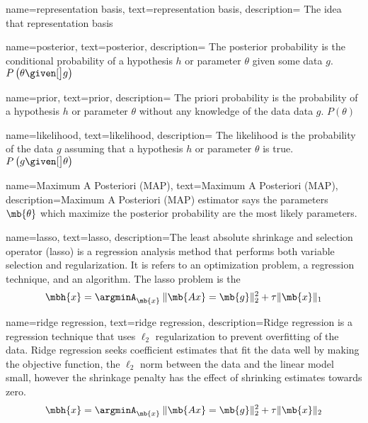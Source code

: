 {
name={representation basis},
text={representation basis},
description={ The idea that representation basis}
}

{
name={posterior},
text={posterior},
description={ The posterior probability is the conditional probability of a hypothesis $h$ or parameter $\theta$ given some data $g$. $ P \left( \theta \given[\big] g \right) $}
}

{
name={prior},
text={prior},
description={ The priori probability is the probability of a hypothesis $h$ or parameter $\theta$ without any knowledge of the data data $g$. $ P \left( \theta \right) $}
}

{
name={likelihood},
text={likelihood},
description={ The likelihood is the probability of the data $g$ assuming that a hypothesis $h$ or parameter $\theta$ is true. $P \left( g \given[\big] \theta \right)$}
}

{
name={Maximum A Posteriori (MAP)},
text={Maximum A Posteriori (MAP)},
description={Maximum A Posteriori (MAP) estimator says the parameters  $ \mb{\theta} $ which maximize the \gls{posterior} probability are the most likely parameters.}
}

{
name={lasso},
text={lasso},
description={The least absolute shrinkage and selection operator (lasso) is a regression analysis method that performs both variable selection and regularization. It is refers to an optimization problem, a regression technique, and an algorithm. The lasso problem is the
%
\begin{equation*}
	\mbh{x} = \argminA_{\mb{x}} \: \| \mb{Ax} = \mb{g} \|_{2}^{2} + \tau \| \mb{x} \|_1
\end{equation*}
 }
}

{
name={ridge regression},
text={ridge regression},
description={Ridge regression is a regression technique that uses $\ell_2$ regularization to prevent overfitting of the data. Ridge regression seeks coefficient estimates that fit the data well by making the objective function, the $\ell_2$ norm between the data and the linear model small, however the shrinkage penalty has the effect of shrinking estimates towards zero. 
%
\begin{equation*}
	\mbh{x} = \argminA_{\mb{x}} \: \| \mb{Ax} = \mb{g} \|_{2}^{2} + \tau \| \mb{x} \|_2
\end{equation*}
 }
}

